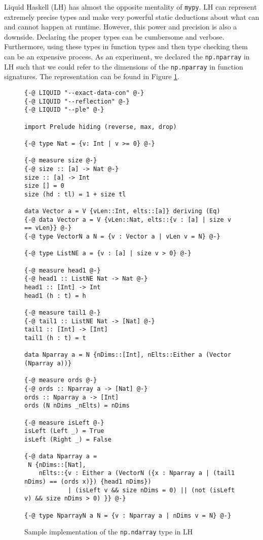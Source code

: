 \documentclass{book}
\begin{document}
Liquid Haskell (LH) has almost the opposite mentality of \texttt{mypy}. LH can represent extremely precise types and make very powerful static deductions about what can and cannot happen at runtime. However, this power and precision is also a downside. Declaring the proper types can be cumbersome and verbose. Furthermore, using these types in function types and then type checking them can be an expensive process. As an experiment, we declared the \texttt{np.nparray} in LH such that we could refer to the dimensions of the \texttt{np.nparray} in function signatures. The representation can be found in Figure \ref{lh-nparray}.

\begin{figure}
    \centering
    \begin{verbatim}
{-@ LIQUID "--exact-data-con" @-}
{-@ LIQUID "--reflection" @-}
{-@ LIQUID "--ple" @-}

import Prelude hiding (reverse, max, drop)

{-@ type Nat = {v: Int | v >= 0} @-}

{-@ measure size @-}
{-@ size :: [a] -> Nat @-}
size :: [a] -> Int
size [] = 0
size (hd : tl) = 1 + size tl

data Vector a = V {vLen::Int, elts::[a]} deriving (Eq)
{-@ data Vector a = V {vLen::Nat, elts::{v : [a] | size v == vLen}} @-}
{-@ type VectorN a N = {v : Vector a | vLen v = N} @-}

{-@ type ListNE a = {v : [a] | size v > 0} @-}

{-@ measure head1 @-}
{-@ head1 :: ListNE Nat -> Nat @-}
head1 :: [Int] -> Int
head1 (h : t) = h

{-@ measure tail1 @-}
{-@ tail1 :: ListNE Nat -> [Nat] @-}
tail1 :: [Int] -> [Int]
tail1 (h : t) = t

data Nparray a = N {nDims::[Int], nElts::Either a (Vector (Nparray a))}

{-@ measure ords @-}
{-@ ords :: Nparray a -> [Nat] @-}
ords :: Nparray a -> [Int]
ords (N nDims _nElts) = nDims

{-@ measure isLeft @-}
isLeft (Left _) = True
isLeft (Right _) = False

{-@ data Nparray a =
 N {nDims::[Nat],
    nElts::{v : Either a (VectorN ({x : Nparray a | (tail1 nDims) == (ords x)}) {head1 nDims})
            | (isLeft v && size nDims = 0) || (not (isLeft v) && size nDims > 0) }} @-}

{-@ type NparrayN a N = {v : Nparray a | nDims v = N} @-}\end{verbatim}

    \caption{Sample implementation of the \texttt{np.ndarray} type in LH}
    \label{lh-nparray}


\end{figure}
\end{document}
